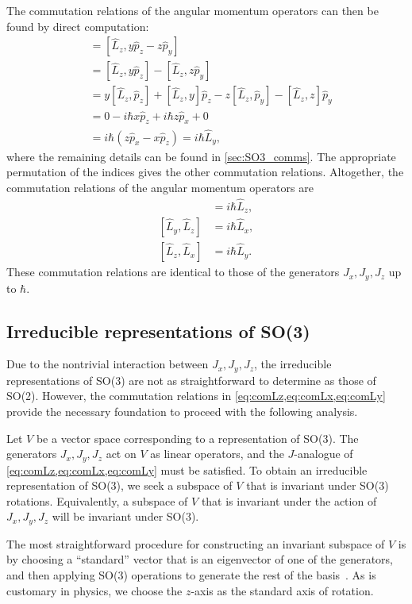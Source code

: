 The commutation relations of the angular momentum operators can then be found by direct computation:
\begin{align*}
    [\hat{L}_z,\hat{L}_x]
        &= [\hat{L}_z, y \hat{p}_z-z\hat{p}_y] \\
        &= [\hat{L}_z, y \hat{p}_z] - [\hat{L}_z, z\hat{p}_y] \\
        &= y[\hat{L}_z, \hat{p}_z] + [\hat{L}_z, y]\hat{p}_z - z[\hat{L}_z, \hat{p}_y] - [\hat{L}_z, z]\hat{p}_y \\
        &= 0 - i\hbar x\hat{p}_z + i\hbar z\hat{p}_x + 0 \\
        &= i\hbar(z\hat{p}_x - x\hat{p}_z) = i\hbar\hat{L}_y,
\end{align*}
where the remaining details can be found in \cref{sec:SO3_comms}. The appropriate permutation of the indices gives the other commutation relations. Altogether, the commutation relations of the angular momentum operators are
\begin{align}
    [\hat{L}_x,\hat{L}_y] &= i\hbar\hat{L}_z, \label{eq:comLz} \\
    [\hat{L}_y,\hat{L}_z] &= i\hbar\hat{L}_x, \label{eq:comLx} \\
    [\hat{L}_z,\hat{L}_x] &= i\hbar\hat{L}_y. \label{eq:comLy}
\end{align}
These commutation relations are identical to those of the generators $J_x,J_y,J_z$ up to $\hbar$.

\subsection{Irreducible representations of SO(3)}\label{sub:irr_SO3}
Due to the nontrivial interaction between $J_x,J_y,J_z$, the irreducible representations of SO(3) are not as straightforward to determine as those of SO(2). However, the commutation relations in \cref{eq:comLz,eq:comLx,eq:comLy} provide the necessary foundation to proceed with the following analysis.

Let $V$ be a vector space corresponding to a representation of SO(3). The generators $J_x,J_y,J_z$ act on $V$ as linear operators, and the $J$-analogue of \cref{eq:comLz,eq:comLx,eq:comLy} must be satisfied. To obtain an irreducible representation of SO(3), we seek a subspace of $V$ that is invariant under SO(3) rotations. Equivalently, a subspace of $V$ that is invariant under the action of $J_x,J_y,J_z$ will be invariant under SO(3).

The most straightforward procedure for constructing an invariant subspace of $V$ is by choosing a ``standard'' vector that is an eigenvector of one of the generators, and then applying SO(3) operations to generate the rest of the basis~\cite{Tung1985}. As is customary in physics, we choose the $z$-axis as the standard axis of rotation.

